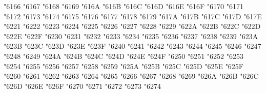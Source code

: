 {\Uchar\jis"6166 %
\Uchar\jis"6167 %
\Uchar\jis"6168 %
\Uchar\jis"6169 %
\Uchar\jis"616A %
\Uchar\jis"616B %
\Uchar\jis"616C %
\Uchar\jis"616D %
\Uchar\jis"616E %
\Uchar\jis"616F %
\Uchar\jis"6170 %
\Uchar\jis"6171 %
\Uchar\jis"6172 %
\Uchar\jis"6173 %
\Uchar\jis"6174 %
\Uchar\jis"6175 %
\Uchar\jis"6176 %
\Uchar\jis"6177 %
\Uchar\jis"6178 %
\Uchar\jis"6179 %
\Uchar\jis"617A %
\Uchar\jis"617B %
\Uchar\jis"617C %
\Uchar\jis"617D %
\Uchar\jis"617E %
\Uchar\jis"6221 %
\Uchar\jis"6222 %
\Uchar\jis"6223 %
\Uchar\jis"6224 %
\Uchar\jis"6225 %
\Uchar\jis"6226 %
\Uchar\jis"6227 %
\Uchar\jis"6228 %
\Uchar\jis"6229 %
\Uchar\jis"622A %
\Uchar\jis"622B %
\Uchar\jis"622C %
\Uchar\jis"622D %
\Uchar\jis"622E %
\Uchar\jis"622F %
\Uchar\jis"6230 %
\Uchar\jis"6231 %
\Uchar\jis"6232 %
\Uchar\jis"6233 %
\Uchar\jis"6234 %
\Uchar\jis"6235 %
\Uchar\jis"6236 %
\Uchar\jis"6237 %
\Uchar\jis"6238 %
\Uchar\jis"6239 %
\Uchar\jis"623A %
\Uchar\jis"623B %
\Uchar\jis"623C %
\Uchar\jis"623D %
\Uchar\jis"623E %
\Uchar\jis"623F %
\Uchar\jis"6240 %
\Uchar\jis"6241 %
\Uchar\jis"6242 %
\Uchar\jis"6243 %
\Uchar\jis"6244 %
\Uchar\jis"6245 %
\Uchar\jis"6246 %
\Uchar\jis"6247 %
\Uchar\jis"6248 %
\Uchar\jis"6249 %
\Uchar\jis"624A %
\Uchar\jis"624B %
\Uchar\jis"624C %
\Uchar\jis"624D %
\Uchar\jis"624E %
\Uchar\jis"624F %
\Uchar\jis"6250 %
\Uchar\jis"6251 %
\Uchar\jis"6252 %
\Uchar\jis"6253 %
\Uchar\jis"6254 %
\Uchar\jis"6255 %
\Uchar\jis"6256 %
\Uchar\jis"6257 %
\Uchar\jis"6258 %
\Uchar\jis"6259 %
\Uchar\jis"625A %
\Uchar\jis"625B %
\Uchar\jis"625C %
\Uchar\jis"625D %
\Uchar\jis"625E %
\Uchar\jis"625F %
\Uchar\jis"6260 %
\Uchar\jis"6261 %
\Uchar\jis"6262 %
\Uchar\jis"6263 %
\Uchar\jis"6264 %
\Uchar\jis"6265 %
\Uchar\jis"6266 %
\Uchar\jis"6267 %
\Uchar\jis"6268 %
\Uchar\jis"6269 %
\Uchar\jis"626A %
\Uchar\jis"626B %
\Uchar\jis"626C %
\Uchar\jis"626D %
\Uchar\jis"626E %
\Uchar\jis"626F %
\Uchar\jis"6270 %
\Uchar\jis"6271 %
\Uchar\jis"6272 %
\Uchar\jis"6273 %
\Uchar\jis"6274 %
}
